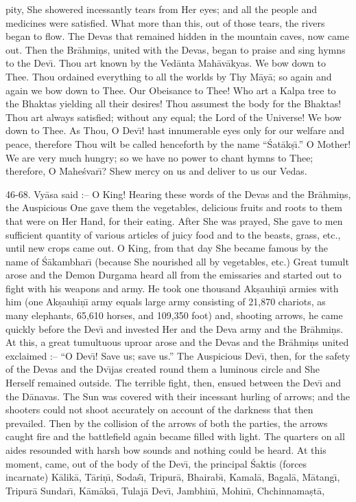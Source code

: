 pity, She showered incessantly tears from Her eyes; and all the people and medicines were satisfied. What more than this, out of those tears, the rivers began to flow. The Devas that remained hidden in the mountain caves, now came out. Then the Br\=ahmi\d{n}s, united with the Devas, began to praise and sing hymns to the Dev\={\i}. Thou art known by the Ved\=anta Mah\=av\=akyas. We bow down to Thee. Thou ordained everything to all the worlds by Thy M\=ay\=a; so again and again we bow down to Thee. Our Obeisance to Thee! Who art a Kalpa tree to the Bhaktas yielding all their desires! Thou assumest the body for the Bhaktas! Thou art always satisfied; without any equal; the Lord of the Universe! We bow down to Thee. As Thou, O Dev\={\i}! hast innumerable eyes only for our welfare and peace, therefore Thou wilt be called henceforth by the name ``\'Sat\=ak\d{s}\={\i}.'' O Mother! We are very much hungry; so we have no power to chant hymns to Thee; therefore, O Mahe\'svar\={\i}? Shew mercy on us and deliver to us our Vedas.

46-68. Vy\=asa said :-- O King! Hearing these words of the Devas and the Br\=ahmi\d{n}s, the Auspicious One gave them the vegetables, delicious fruits and roots to them that were on Her Hand, for their eating. After She was prayed, She gave to men sufficient quantity of various articles of juicy food and to the beasts, grass, etc., until new crops came out. O King, from that day She became famous by the name of \'S\=akambhar\={\i} (because She nourished all by vegetables, etc.) Great tumult arose and the Demon Durgama heard all from the emissaries and started out to fight with his weapons and army. He took one thousand Ak\d{s}auhi\d{n}\={\i} armies with him (one Ak\d{s}auhi\d{n}\={\i} army equals large army consisting of 21,870 chariots, as many elephants, 65,610 horses, and 109,350 foot) and, shooting arrows, he came quickly before the Dev\={\i} and invested Her and the Deva army and the Br\=ahmi\d{n}s. At this, a great tumultuous uproar arose and the Devas and the Br\=ahmi\d{n}s united exclaimed :-- ``O Dev\={\i}! Save us; save us.'' The Auspicious Dev\={\i}, then, for the safety of the Devas and the Dv\={\i}jas created round them a luminous circle and She Herself remained outside. The terrible fight, then, ensued between the Dev\={\i} and the D\=anavas. The Sun was covered with their incessant hurling of arrows; and the shooters could not shoot accurately on account of the darkness that then prevailed. Then by the collision of the arrows of both the parties, the arrows caught fire and the battlefield again became filled with light. The quarters on all aides resounded with harsh bow sounds and nothing could be heard. At this moment, came, out of the body of the Dev\={\i}, the principal \'Saktis (forces incarnate) K\=alik\=a, T\=ari\d{n}\={\i}, Soda\'s\={\i}, Tripur\=a, Bhairab\={\i}, Kamal\=a, Bagal\=a, M\=atang\={\i}, Tripur\=a Sundar\={\i}, K\=am\=aks\={\i}, Tulaj\=a Dev\={\i}, Jambhin\={\i}, Mohin\={\i}, Chchinnama\d{s}t\=a,

